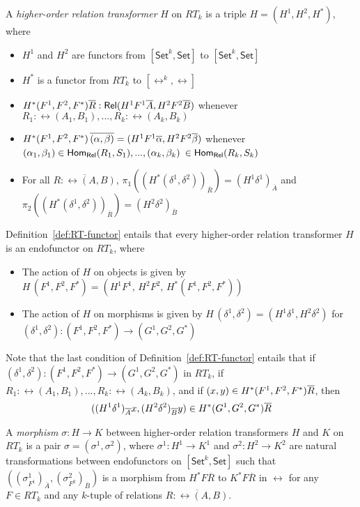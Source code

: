 \documentclass{lmcs}
\theoremstyle{plain}\newtheorem{satz}[thm]{Satz}
\newcommand{\set}{\mathsf{Set}}
\begin{document}
{\begin{defi}\label{def:RT-functor}
A {\em higher-order relation transformer} $H$ on $RT_k$ is a triple $H
= (H^1,H^2,H^*)$, where
\begin{itemize}
\item $H^1$ and $H^2$ are functors from $[\set^k,\set]$ to $[\set^k,\set]$
\item $H^*$ is a functor from $RT_k$ to $[\rel^k,\rel]$
\item $H^*(F^1,F^2,F^*) \overline{R} : \mathsf{Rel}(H^1F^1 \overline{A}, H^2F^2 \overline{B})$
  whenever $R_1:\rel(A_1,B_1),...,R_k:\rel(A_k,B_k)$
\item $H^*(F^1,F^2,F^*)\, \overline{(\alpha, \beta)} = (H^1F^1\overline{\alpha},
  H^2F^2 \overline{\beta})$ whenever $(\alpha_1, \beta_1) \in
  \mathsf{Hom_{Rel}}(R_1,S_1),..., (\alpha_k, \beta_k)$ $\in \mathsf{Hom_{Rel}}(R_k,S_k)$
\item For all $\overline{R : \rel(A,B)}$,
  $\pi_1((H^*(\delta^1,\delta^2))_{\overline{R}}) = (H^1
  \delta^1)_{\overline{A}}$ and
  $\pi_2((H^*(\delta^1,\delta^2))_{\overline{R}}) = (H^2
  \delta^2)_{\overline{B}}$
\end{itemize}
\end{defi}
\noindent
Definition~\ref{def:RT-functor} entails that every higher-order
relation transformer $H$ is an endofunctor on $RT_k$, where
\begin{itemize}
\item The action of $H$ on objects is given by $H\,(F^1,F^2,F^*) =
  (H^1F^1,\,H^2F^2,\,H^*(F^1,F^2,F^*))$
\item The action of $H$ on morphisms is given by
  $H\,(\delta^1,\delta^2) = (H^1\delta^1,H^2\delta^2)$ for
  $(\delta^1,\delta^2) : (F^1,F^2,F^*)\to (G^1,G^2,G^*)$
\end{itemize}  
Note that the last condition of Definition~\ref{def:RT-functor}
entails that if $(\delta^1,\delta^2) : (F^1,F^2,F^*)\to (G^1,G^2,G^*)$
in $RT_k$, if $R_1:\rel(A_1,B_1),...,R_k:\rel(A_k,B_k)$, and if $(x,
y) \in H^*(F^1,F^2,F^*)\overline{R}$, then
\[((H^1\delta^1)_{\overline{A}}x, (H^2\delta^2)_{\overline{B}}y) \in
H^*(G^1,G^2,G^*)\overline{R}\] 

\begin{defi}\label{def:RT-nat-trans}
A {\em morphism} $\sigma : H \to K$ between higher-order relation
transformers $H$ and $K$ on $RT_k$ is a pair $\sigma = (\sigma^1,
\sigma^2)$, where $\sigma^1 : H^1 \to K^1$ and $\sigma^2 : H^2 \to
K^2$ are natural transformations between endofunctors on
$[\set^k,\set]$ such that $((\sigma^1_{F^1})_{\overline{A}},
(\sigma^2_{F^2})_{\overline{B}})$ is a morphism from $H^*
F\overline{R}$ to $K^* F\overline{R}$ in $\rel$ for any $F \in RT_k$
and any $k$-tuple of relations $\overline{R : \rel(A, B)}$.
\end{defi}

}
\end{document}

